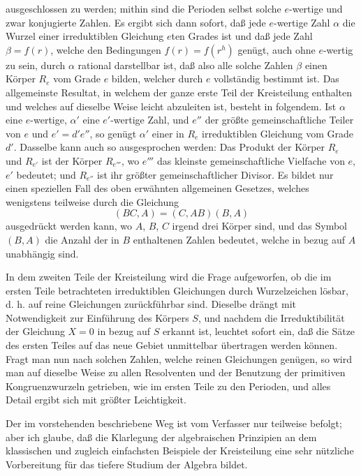\documentclass[11pt]{article}
\newcommand{\origpage}[1]{\par\vspace{0.25em}\noindent{\footnotesize\itshape [Gedruckte Seite #1]}\par\vspace{0.25em}}
\begin{document}
\origpage{416}
ausgeschlossen zu werden; mithin sind die Perioden selbst solche $e$-wertige und zwar konjugierte Zahlen. Es ergibt sich dann sofort, daß jede $e$-wertige Zahl $\alpha$ die Wurzel einer irreduktiblen Gleichung $e$ten Grades ist und daß jede Zahl $\beta=f(r)$, welche den Bedingungen $f(r)=f(r^h)$ genügt, auch ohne $e$-wertig zu sein, durch $\alpha$ rational darstellbar ist, daß also alle solche Zahlen $\beta$ einen Körper $R_e$ vom Grade $e$ bilden, welcher durch $e$ vollständig bestimmt ist. Das allgemeinste Resultat, in welchem der ganze erste Teil der Kreisteilung enthalten und welches auf dieselbe Weise leicht abzuleiten ist, besteht in folgendem. Ist $\alpha$ eine $e$-wertige, $\alpha'$ eine $e'$-wertige Zahl, und $e''$ der größte gemeinschaftliche Teiler von $e$ und $e'=d'e''$, so genügt $\alpha'$ einer in $R_e$ irreduktiblen Gleichung vom Grade $d'$. Dasselbe kann auch so ausgesprochen werden: Das Produkt der Körper $R_e$ und $R_{e'}$ ist der Körper $R_{e'''}$, wo $e'''$ das kleinste gemeinschaftliche Vielfache von $e$, $e'$ bedeutet; und $R_{e''}$ ist ihr größter gemeinschaftlicher Divisor. Es bildet nur einen speziellen Fall des oben erwähnten allgemeinen Gesetzes, welches wenigstens teilweise durch die Gleichung
\[
 (BC,A)=(C,AB)(B,A)
\]
ausgedrückt werden kann, wo $A$, $B$, $C$ irgend drei Körper sind, und das Symbol $(B,A)$ die Anzahl der in $B$ enthaltenen Zahlen bedeutet, welche in bezug auf $A$ unabhängig sind.

In dem zweiten Teile der Kreisteilung wird die Frage aufgeworfen, ob die im ersten Teile betrachteten irreduktiblen Gleichungen durch Wurzelzeichen lösbar, d. h. auf reine Gleichungen zurückführbar sind. Dieselbe drängt mit Notwendigkeit zur Einführung des Körpers $S$, und nachdem die Irreduktibilität der Gleichung $X=0$ in bezug auf $S$ erkannt ist, leuchtet sofort ein, daß die Sätze des ersten Teiles auf das neue Gebiet unmittelbar übertragen werden können. Fragt man nun nach solchen Zahlen, welche reinen Gleichungen genügen, so wird man auf dieselbe Weise zu allen Resolventen und der Benutzung der primitiven Kongruenzwurzeln getrieben, wie im ersten Teile zu den Perioden, und alles Detail ergibt sich mit größter Leichtigkeit.

Der im vorstehenden beschriebene Weg ist vom Verfasser nur teilweise befolgt; aber ich glaube, daß die Klarlegung der algebraischen Prinzipien an dem klassischen und zugleich einfachsten Beispiele der Kreisteilung eine sehr nützliche Vorbereitung für das tiefere Studium der Algebra bildet.
\end{document}
